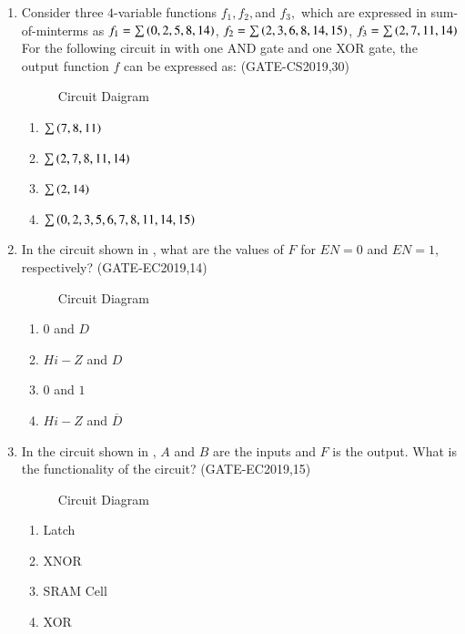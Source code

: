 \begin{enumerate}[label=\arabic*.,ref=\theenumi]
\item Consider three $4$-variable functions $f_1, f_2, $and $f_3,$ which are expressed in sum-of-minterms as \newline \quad $f_1 = \sum\left(0,2,5,8,14\right)$, \quad $f_2=\sum\left(2,3,6,8,14,15\right)$, \quad $f_3 = \sum\left(2,7,11,14\right)$ \newline For the following circuit 
	in 
	with one AND gate and one XOR gate, the output function $f$ can be expressed as:
	\hfill(GATE-CS2019,30)
	\begin{figure}[H]
		 \centering
		 \resizebox{\columnwidth}{!}{%
			
			}
                 \caption{Circuit Daigram}
	\label{fig:GATE-CS2019,30}
	\end{figure}
		\begin{enumerate}
		\item $\sum\left(7,8,11\right)$
		\item $\sum\left(2,7,8,11,14\right)$
		\item $\sum\left(2,14\right)$
		\item $\sum\left(0,2,3,5,6,7,8,11,14,15\right)$
		\end{enumerate}

\item In the circuit shown
	in ,
	what are the values of $F$ for $EN=0$ and $EN=1$,  respectively?
 \hfill(GATE-EC2019,14)  

\begin{figure}
    \centering
    \resizebox{\columnwidth}{!}{%
    
	}
    \caption{Circuit Diagram}
	\label{fig:GATE-EC2019,14} 
\end{figure}
\begin{enumerate}
    \item $0$ and $D$
    \item $Hi-Z$ and $D$
    \item $0$ and $1$
    \item $Hi-Z$ and $\overline{D}$
\end{enumerate}
\item In the circuit shown
	   in ,
	$A$ and $B$ are the inputs and $F$ is the output. What is the functionality of the circuit?
           \hfill(GATE-EC2019,15)
           
\begin{figure}[H]
\centering
\resizebox{\columnwidth}{!}{%

	}
\caption{Circuit Diagram}
	   \label{fig:GATE-EC2019,15}
\end{figure}
\begin{enumerate}
\item Latch
\item XNOR
\item SRAM Cell
\item XOR
\end{enumerate}


\end{enumerate}

